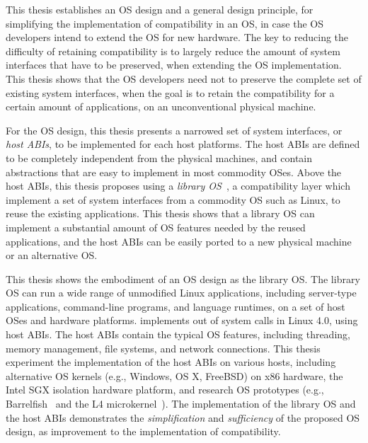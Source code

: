 This thesis establishes an OS design and a general design principle, for simplifying the implementation of compatibility in an OS, in case the OS developers intend to extend the OS for new hardware.
The key to reducing the difficulty of retaining compatibility
is to largely reduce the amount of system interfaces that have to be preserved,
when extending the OS implementation.
This thesis shows that the OS developers need not to preserve the complete set of existing system interfaces, when the goal is to retain the compatibility for a certain amount of applications, on an unconventional physical machine.



For the OS design, this thesis presents a narrowed set of system interfaces,
or {\em host ABIs},
to be implemented for each host platforms.
The host ABIs are defined to be completely independent from the physical machines,
and contain abstractions that are easy to implement in most commodity OSes.
Above the host ABIs, this thesis proposes using a {\em library OS}~\cite{porter11drawbridge,engler95exokernel,libra,unikernels},
a compatibility layer which implement a set of system interfaces from a commodity OS such as Linux, to reuse the existing applications.
This thesis shows that a library OS can implement a substantial amount of OS features needed by the reused applications,
and the host ABIs can be easily ported to a new physical machine or an alternative OS.


This thesis shows the embodiment of an OS design as the \graphene{} library OS.
The \graphene{} library OS can run a wide range of unmodified Linux applications,
including server-type applications, command-line programs, and language runtimes, on a set of host OSes and hardware platforms.
\graphene{} implements  \graphenesyscalls{} out of \linuxsyscalls{} system calls in Linux 4.0,
using \palcalls{} host ABIs. 
The host ABIs contain the typical OS features, including threading, memory management, file systems, and network connections.
This thesis experiment the implementation of the host ABIs on various hosts,
including alternative OS kernels (e.g., Windows, OS X, FreeBSD) on x86 hardware,
the Intel SGX isolation hardware platform,
and research OS prototypes (e.g., Barrelfish~\cite{baumann09barrelfish} and the L4 microkernel~\cite{l4family}).
The implementation of the \graphene{} library OS and the host ABIs demonstrates the {\em simplification} and {\em sufficiency} of the proposed OS design, as improvement to the implementation of compatibility.


